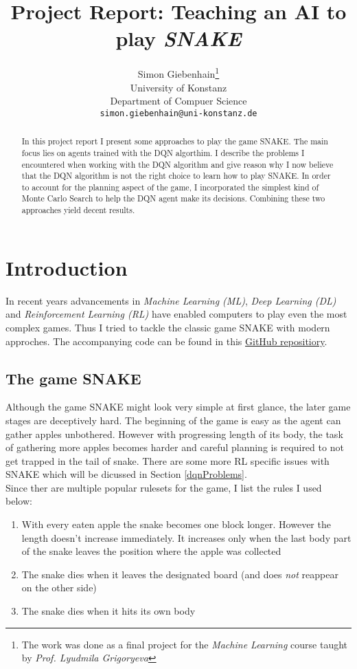 \documentclass{article}
\title{Project Report: Teaching an AI to play \emph{SNAKE}}
\author{
  Simon Giebenhain\thanks{The work was done as a final project for the \emph{Machine Learning} course taught by \emph{Prof. Lyudmila Grigoryeva}} \\
  University of Konstanz \\
 Department of Compuer Science \\
  \texttt{simon.giebenhain@uni-konstanz.de} \\
}
\begin{document}
\maketitle

\begin{abstract}
In this project report I present some approaches to play the game SNAKE. The main focus lies on agents trained with the DQN algorthim. I describe the problems I encountered when working with the DQN algorithm and give reason why I now believe that the DQN algorithm is not the right choice to learn how to play SNAKE. In order to account for the planning aspect of the game, I incorporated the simplest kind of Monte Carlo Search to help the DQN agent make its decisions. Combining these two approaches yield decent results.
\end{abstract}




\section{Introduction}



In recent years advancements in \emph{Machine Learning (ML)}, \emph{Deep Learning (DL)} and \emph{Reinforcement Learning (RL)} have enabled computers to play even the most complex games. Thus I tried to tackle the classic game SNAKE with modern approches. The accompanying code can be found in this \href{https://github.com/SimonGiebenhain/MLProject/}{GitHub repositiory}.

\subsection{The game SNAKE}
Although the game SNAKE might look very simple at first glance, the later game stages are deceptively hard. The beginning of the game is easy as the agent can gather apples unbothered. However with progressing length of its body, the task of gathering more apples becomes harder and careful planning is required to not get trapped in the tail of snake. There are some more RL specific issues with SNAKE which will be dicussed in Section \ref{dqnProblems}. \\ 

Since ther are multiple popular rulesets for the game, I list the rules I used below:
\begin{enumerate}
	\item With every eaten apple the snake becomes one block longer. However the length doesn't increase immediately. It increases only when the last body part of the snake leaves the position where the apple was collected
	\item The snake dies when it leaves the designated board (and does \emph{not} reappear on the other side)
	\item The snake dies when it hits its own body
\end{enumerate}
\end{document}

